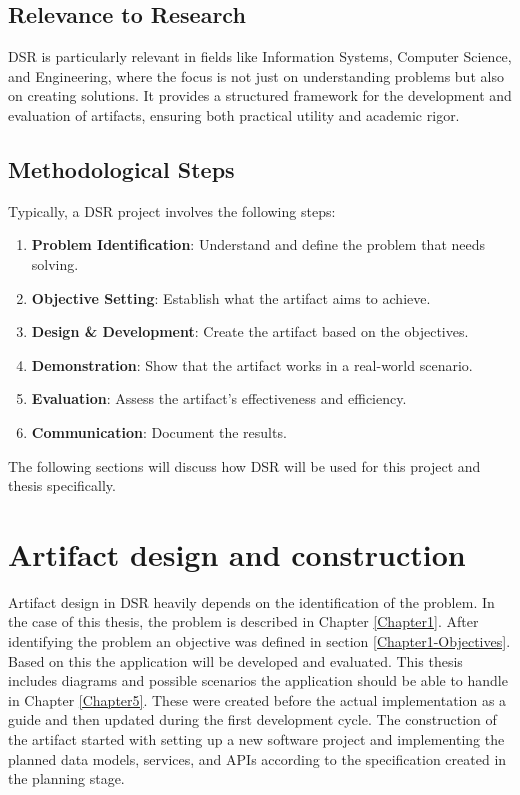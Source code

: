 \subsection{Relevance to Research}

DSR is particularly relevant in fields like Information Systems, 
Computer Science, and Engineering, 
where the focus is not just on understanding problems 
but also on creating solutions. 
It provides a structured framework for the development 
and evaluation of artifacts, ensuring both practical 
utility and academic rigor.

\subsection{Methodological Steps}

Typically, a DSR project involves the following steps:

\begin{enumerate}
    \item \textbf{Problem Identification}: Understand and define the problem that needs solving.
    \item \textbf{Objective Setting}: Establish what the artifact aims to achieve.
    \item \textbf{Design \& Development}: Create the artifact based on the objectives.
    \item \textbf{Demonstration}: Show that the artifact works in a real-world scenario.
    \item \textbf{Evaluation}: Assess the artifact's effectiveness and efficiency.
    \item \textbf{Communication}: Document the results.
\end{enumerate}

The following sections will discuss how DSR will be used for this project and thesis
specifically.

\section{Artifact design and construction}
Artifact design in DSR heavily depends on the identification of the problem.
In the case of this thesis, the problem is described in Chapter \ref{Chapter1}.
After identifying the problem an objective was defined in 
section \ref{Chapter1-Objectives}. 
Based on this the application will be developed and evaluated. 
This thesis includes diagrams and possible scenarios the application should be able to handle in Chapter \ref{Chapter5}. 
These were created before the actual implementation as a guide
and then updated during the first development cycle. 
The construction of the artifact started with setting up a new software project and implementing the planned data models,
services, and APIs according to the specification created in the planning stage. 

